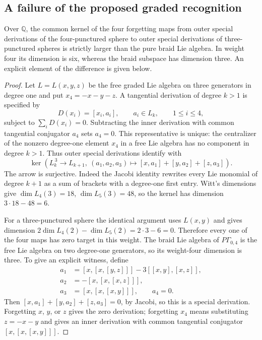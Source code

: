 \subsection*{A failure of the proposed graded recognition}

Over \(\mathbb Q\), the common kernel of the four forgetting maps
from outer special derivations of the four-punctured sphere to
outer special derivations of three-punctured spheres is strictly
larger than the pure braid Lie algebra. In weight four its
dimension is six, whereas the braid subspace has dimension three.
An explicit element of the difference is given below.
\begin{proof}
Let \(L=L(x,y,z)\) be the free graded Lie algebra on three generators
in degree one and put \(x_4=-x-y-z\).
A tangential derivation of degree \(k>1\) is specified by
\[
 D(x_i)=[x_i,a_i],\qquad a_i\in L_k,\qquad 1\leq i\leq4,
\]
subject to \(\sum_iD(x_i)=0\). Subtracting the inner derivation
with common tangential conjugator \(a_4\) sets \(a_4=0\).
This representative is unique: the centralizer of the nonzero
degree-one element \(x_4\) in a free Lie algebra has no component
in degree \(k>1\). Thus outer special derivations identify with
\[
 \ker\left(L_k^{\,3}\longrightarrow L_{k+1},\
             (a_1,a_2,a_3)\longmapsto
             [x,a_1]+[y,a_2]+[z,a_3]\right).
\]
The arrow is surjective. Indeed the Jacobi identity rewrites
every Lie monomial of degree \(k+1\) as a sum of brackets with a
degree-one first entry. Witt's dimensions give
\(\dim L_4(3)=18\), \(\dim L_5(3)=48\), so the kernel has
dimension \(3\cdot18-48=6\).

For a three-punctured sphere the identical argument uses
\(L(x,y)\) and gives dimension
\(2\dim L_4(2)-\dim L_5(2)=2\cdot3-6=0\).
Therefore every one of the four maps has zero target in this
weight. The braid Lie algebra of \(P\Gamma_{0,4}\) is the free
Lie algebra on two degree-one generators, so its weight-four
dimension is three. To give an explicit witness, define
\[
\begin{split}
 a_1&=[x,[x,[y,z]]]-3[[x,y],[x,z]],\\
 a_2&=-[x,[x,[x,z]]],\\
 a_3&=[x,[x,[x,y]]],\qquad a_4=0.
\end{split}
\]
Then \([x,a_1]+[y,a_2]+[z,a_3]=0\), by Jacobi, so this is
a special derivation. Forgetting \(x\), \(y\), or \(z\) gives
the zero derivation; forgetting \(x_4\) means substituting
\(z=-x-y\) and gives an inner derivation with common
tangential conjugator \([x,[x,[x,y]]]\).


\end{proof}
